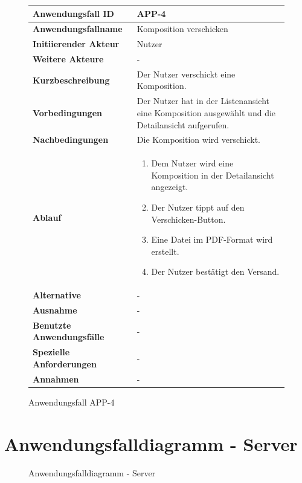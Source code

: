 \begin{figure}[h]
	\centering
	\begin{tabularx}{\textwidth}{ X | X }
		\textbf{Anwendungsfall ID} & APP-4 \\ \hline
		\textbf{Anwendungsfallname} & Komposition verschicken \\ \hline
		\textbf{Initiierender Akteur} & Nutzer \\ \hline
		\textbf{Weitere Akteure} & -  \\ \hline
		\textbf{Kurzbeschreibung} & Der Nutzer verschickt eine Komposition.  \\ \hline
		\textbf{Vorbedingungen} & Der Nutzer hat in der Listenansicht eine Komposition ausgewählt und die Detailansicht aufgerufen.  \\ \hline
		\textbf{Nachbedingungen} & Die Komposition wird verschickt.  \\ \hline
		\textbf{Ablauf} &
		\begin{enumerate}
			\item Dem Nutzer wird eine Komposition in der Detailansicht angezeigt.
			\item Der Nutzer tippt auf den Verschicken-Button.
			\item Eine Datei im PDF-Format wird erstellt.
			\item Der Nutzer bestätigt den Versand.
		\end{enumerate} \\ \hline
		\textbf{Alternative} &
		-  \\ \hline
		\textbf{Ausnahme} &
		- \\ \hline
		\textbf{Benutzte Anwendungsfälle} & - \\ \hline
		\textbf{Spezielle Anforderungen} & - \\ \hline
		\textbf{Annahmen} & -
	\end{tabularx}
	\caption{Anwendungsfall APP-4}
	\label{fig:anwendungsfall-app-tabelle-APP-4}
\end{figure}

\newpage


\section{Anwendungsfalldiagramm - Server}

\begin{figure}[h]
	\centering
	\caption{Anwendungsfalldiagramm - Server}
	\label{fig:anwendungsfalldiagramm-server}
\end{figure}

